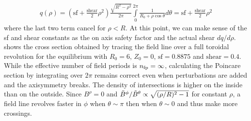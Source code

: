 \begin{align*}
     q(\rho) = (\text{sf}+\frac{\text{shear}}{2}\rho^2)\frac{\sqrt{R^2-\rho^2}}{2\pi}\int\limits_{0}^{2\pi}\frac{1}{R_0 + \rho\cos{\theta}}d\theta = \text{sf}+\frac{\text{shear}}{2}\rho^2
\end{align*}
where the last two term cancel for $\rho < R$. At this point, we can make sense of the sf and shear constants as the on axis safety factor and the actual shear $dq/d\rho$.  shows the cross section obtained by tracing the field line over a full toroidal revolution for the equilibrium with $R_0 = 6$, $Z_0 = 0$, $\text{sf} = 0.8875$ and $\text{shear} = 0.4$. While the effective number of field periods is $n_\text{fp} = \infty$, calculating the Poincare section by integrating over $2\pi$ remains correct even when perturbations are added and the axisymmetry breaks. The density of intersections is higher on the inside than on the outside. Since $B^\rho = 0$ and $\Tilde{B}^\phi/\tilde{B}^\theta \propto \sqrt{(\rho/R)^2-1}$ for constant $\rho$, a field line revolves faster in $\phi$ when $\theta \sim \pi$ then when $\theta \sim 0$ and thus make more crossings.

